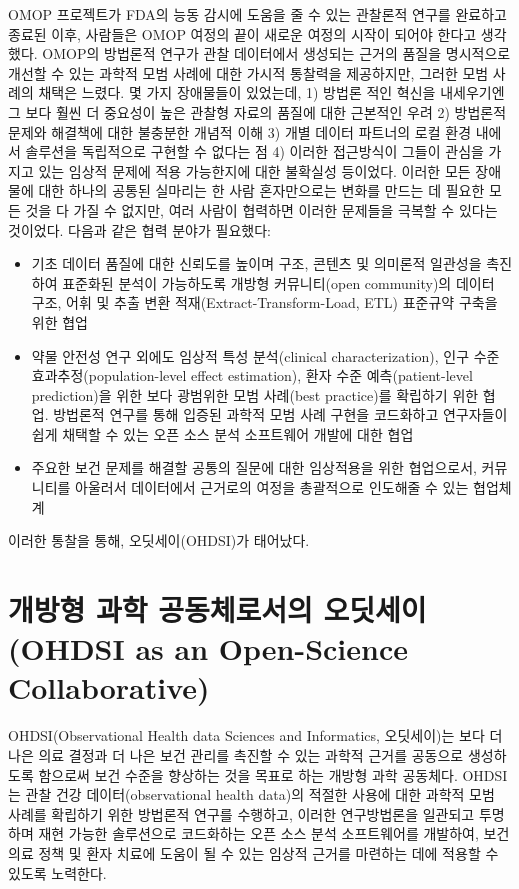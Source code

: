\documentclass[11pt]{book}
\providecommand{\tightlist}{%
  \setlength{\itemsep}{0pt}\setlength{\parskip}{0pt}}
\theoremstyle{definition}
\theoremstyle{definition}
\theoremstyle{definition}
\theoremstyle{remark}
\begin{document}
OMOP 프로젝트가 FDA의 능동 감시에 도움을 줄 수 있는 관찰론적 연구를
완료하고 종료된 이후, 사람들은 OMOP 여정의 끝이 새로운 여정의 시작이
되어야 한다고 생각했다. OMOP의 방법론적 연구가 관찰 데이터에서 생성되는
근거의 품질을 명시적으로 개선할 수 있는 과학적 모범 사례에 대한 가시적
통찰력을 제공하지만, 그러한 모범 사례의 채택은 느렸다. 몇 가지
장애물들이 있었는데, 1) 방법론 적인 혁신을 내세우기엔 그 보다 훨씬 더
중요성이 높은 관찰형 자료의 품질에 대한 근본적인 우려 2) 방법론적 문제와
해결책에 대한 불충분한 개념적 이해 3) 개별 데이터 파트너의 로컬 환경
내에서 솔루션을 독립적으로 구현할 수 없다는 점 4) 이러한 접근방식이
그들이 관심을 가지고 있는 임상적 문제에 적용 가능한지에 대한 불확실성
등이었다. 이러한 모든 장애물에 대한 하나의 공통된 실마리는 한 사람
혼자만으로는 변화를 만드는 데 필요한 모든 것을 다 가질 수 없지만, 여러
사람이 협력하면 이러한 문제들을 극복할 수 있다는 것이었다. 다음과 같은
협력 분야가 필요했다:

\begin{itemize}
\tightlist
\item
  기초 데이터 품질에 대한 신뢰도를 높이며 구조, 콘텐츠 및 의미론적
  일관성을 촉진하여 표준화된 분석이 가능하도록 개방형 커뮤니티(open
  community)의 데이터 구조, 어휘 및 추출 변환
  적재(Extract-Transform-Load, ETL) 표준규약 구축을 위한 협업
\item
  약물 안전성 연구 외에도 임상적 특성 분석(clinical characterization),
  인구 수준 효과추정(population-level effect estimation), 환자 수준
  예측(patient-level prediction)을 위한 보다 광범위한 모범 사례(best
  practice)를 확립하기 위한 협업. 방법론적 연구를 통해 입증된 과학적
  모범 사례 구현을 코드화하고 연구자들이 쉽게 채택할 수 있는 오픈 소스
  분석 소프트웨어 개발에 대한 협업
\item
  주요한 보건 문제를 해결할 공통의 질문에 대한 임상적용을 위한
  협업으로서, 커뮤니티를 아울러서 데이터에서 근거로의 여정을 총괄적으로
  인도해줄 수 있는 협업체계
\end{itemize}

이러한 통찰을 통해, 오딧세이(OHDSI)가 태어났다.

\section{개방형 과학 공동체로서의 오딧세이 (OHDSI as an Open-Science
Collaborative)}\label{----ohdsi-as-an-open-science-collaborative}

OHDSI(Observational Health data Sciences and Informatics, 오딧세이)는
보다 더 나은 의료 결정과 더 나은 보건 관리를 촉진할 수 있는 과학적
근거를 공동으로 생성하도록 함으로써 보건 수준을 향상하는 것을 목표로
하는 개방형 과학 공동체다. \citep{Hripcsak2015} OHDSI는 관찰 건강
데이터(observational health data)의 적절한 사용에 대한 과학적 모범
사례를 확립하기 위한 방법론적 연구를 수행하고, 이러한 연구방법론을
일관되고 투명하며 재현 가능한 솔루션으로 코드화하는 오픈 소스 분석
소프트웨어를 개발하여, 보건의료 정책 및 환자 치료에 도움이 될 수 있는
임상적 근거를 마련하는 데에 적용할 수 있도록 노력한다.
\end{document}
